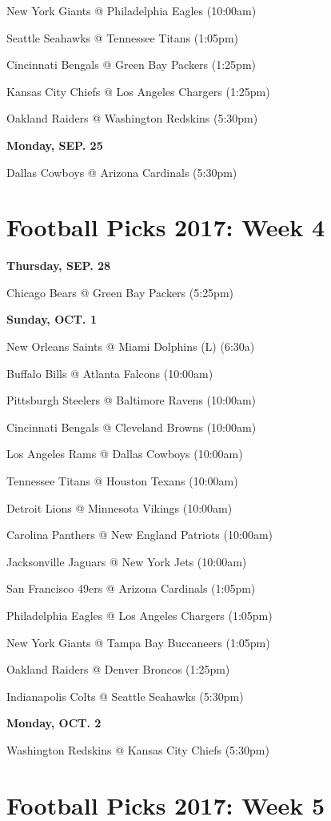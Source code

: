 \documentclass[11pt, letterpaper]{article}
\begin{document}
New York Giants @ Philadelphia Eagles (10:00am)\par
Seattle Seahawks @ Tennessee Titans (1:05pm)\par
Cincinnati Bengals @ Green Bay Packers (1:25pm)\par
Kansas City Chiefs @ Los Angeles Chargers (1:25pm)\par
Oakland Raiders @ Washington Redskins (5:30pm)\par
\noindent \normalsize \textbf{Monday, SEP. 25} \par
Dallas Cowboys @ Arizona Cardinals (5:30pm)\par
\newpage \section*{\LARGE Football Picks 2017: Week 4}
\noindent \normalsize \textbf{Thursday, SEP.    28} \par
Chicago Bears @ Green Bay Packers (5:25pm)\par
\noindent \normalsize \textbf{Sunday, OCT. 1} \par
New Orleans Saints @ Miami Dolphins (L) (6:30a)\par
Buffalo Bills @ Atlanta Falcons (10:00am)\par
Pittsburgh Steelers @ Baltimore Ravens (10:00am)\par
Cincinnati Bengals @ Cleveland Browns (10:00am)\par
Los Angeles Rams @ Dallas Cowboys (10:00am)\par
Tennessee Titans @ Houston Texans (10:00am)\par
Detroit Lions @ Minnesota Vikings (10:00am)\par
Carolina Panthers @ New England Patriots (10:00am)\par
Jacksonville Jaguars @ New York Jets (10:00am)\par
San Francisco 49ers @ Arizona Cardinals (1:05pm)\par
Philadelphia Eagles @ Los Angeles Chargers (1:05pm)\par
New York Giants @ Tampa Bay Buccaneers (1:05pm)\par
Oakland Raiders @ Denver Broncos (1:25pm)\par
Indianapolis Colts @ Seattle Seahawks (5:30pm)\par
\noindent \normalsize \textbf{Monday, OCT. 2} \par
Washington Redskins @ Kansas City Chiefs (5:30pm)\par
\newpage \section*{\LARGE Football Picks 2017: Week 5}
\end{document}
